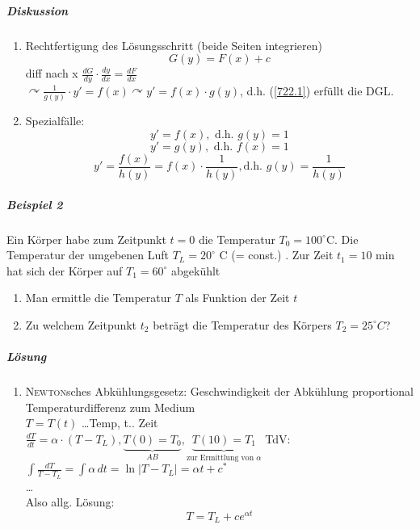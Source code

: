 \documentclass[a4paper]{scrartcl}
\begin{document}
\subparagraph{Diskussion}
\begin{enumerate}
\item Rechtfertigung des Lösungsschritt (beide Seiten integrieren)
\begin{equation}\label{722.1} G(y) = F(x) + c \end{equation}
diff nach x $\frac{dG}{dy} \cdot \frac{dy}{dx} = \frac{dF}{dx}$\\
$\curvearrowright \frac{1}{g(y)} \cdot y' = f(x) \curvearrowright y' = f(x) \cdot g(y)$, d.h. (\ref{722.1}) erfüllt die DGL.
\item Spezialfälle:
\[ y' = f(x), \text{ d.h. } g(y) = 1\]
\[ y' = g(y), \text{ d.h. } f(x) = 1\]
\[ y' = \frac{f(x)}{h(y)} = f(x) \cdot \frac{1}{h(y)}, \text{d.h. } g(y) = \frac{1}{h(y)}\]
\end{enumerate}
\subparagraph{Beispiel 2} Ein Körper habe zum Zeitpunkt $t=0$ die Temperatur $T_0 = 100^\circ $C. Die Temperatur der umgebenen Luft $T_L = 20^\circ$ C (= const.) . Zur Zeit $t_1 = 10$ min hat sich der Körper  auf $T_1 = 60^\circ$ abgekühlt
\begin{enumerate}
\item Man ermittle die Temperatur $T$ als Funktion  der Zeit $t$
\item Zu welchem Zeitpunkt $t_2$ beträgt die Temperatur des Körpers $T_2 = 25^\circ C$?
\end{enumerate}

\subparagraph{Lösung}
\begin{enumerate}
\item \textsc{Newton}sches Abkühlungsgesetz: Geschwindigkeit der Abkühlung proportional Temperaturdifferenz zum Medium\\
$T=T(t)$ \dots Temp, t.. Zeit \\
$\frac{dT}{dt} = \alpha \cdot (T-T_L), \underbrace{T(0) = T_0}_{AB},\underbrace{T(10) = T_1}_{\text{zur Ermittlung von } \alpha}$
TdV: $\int \frac{dT}{T-T_L} = \int \alpha \, dt = \ln{\lvert T - T_L\rvert} = \alpha t + c^*$\\
\dots\\
Also allg. Lösung: \[T = T_L + c e^{\alpha t}\]
\end{enumerate}
\end{document}
